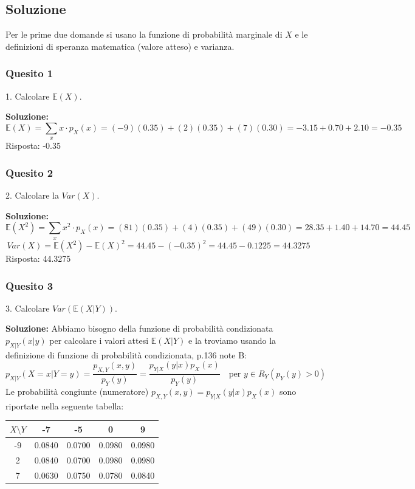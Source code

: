 \documentclass[12pt, a4paper]{article}
\begin{document}
\subsection*{Soluzione}
Per le prime due domande si usano la funzione di probabilità marginale di $X$ e le definizioni di speranza matematica (valore atteso) e varianza.

\subsubsection*{Quesito 1}
1. Calcolare $\mathbb{E}(X)$.

\textbf{Soluzione:}
$$ \mathbb{E}(X) = \sum_{x} x \cdot p_X(x) = (-9)(0.35) + (2)(0.35) + (7)(0.30) = -3.15 + 0.70 + 2.10 = -0.35 $$
Risposta: -0.35

\subsubsection*{Quesito 2}
2. Calcolare la $Var(X)$.

\textbf{Soluzione:}
$$ \mathbb{E}(X^2) = \sum_{x} x^2 \cdot p_X(x) = (81)(0.35) + (4)(0.35) + (49)(0.30) = 28.35 + 1.40 + 14.70 = 44.45 $$
$$ Var(X) = \mathbb{E}(X^2) - \mathbb{E}(X)^2 = 44.45 - (-0.35)^2 = 44.45 - 0.1225 = 44.3275 $$
Risposta: 44.3275

\newpage

\subsubsection*{Quesito 3}
3. Calcolare $Var(\mathbb{E}(X|Y))$.

\textbf{Soluzione:}
Abbiamo bisogno della funzione di probabilità condizionata $p_{X|Y}(x|y)$ per calcolare i valori attesi $\mathbb{E}(X|Y)$ e la troviamo usando la definizione di funzione di probabilità condizionata, p.136 note B:
$$ p_{X|Y}(X=x|Y=y) = \frac{p_{X,Y}(x,y)}{p_Y(y)} = \frac{p_{Y|X}(y|x)p_X(x)}{p_Y(y)} \quad \text{per } y \in R_Y (p_Y(y)>0) $$
Le probabilità congiunte (numeratore) $p_{X,Y}(x,y) = p_{Y|X}(y|x)p_X(x)$ sono riportate nella seguente tabella:

\begin{center}
\begin{tabular}{c|cccc}
\toprule
$X \setminus Y$ & -7 & -5 & 0 & 9 \\
\midrule
-9 & 0.0840 & 0.0700 & 0.0980 & 0.0980 \\
2 & 0.0840 & 0.0700 & 0.0980 & 0.0980 \\
7 & 0.0630 & 0.0750 & 0.0780 & 0.0840 \\
\bottomrule
\end{tabular}
\end{center}
\end{document}
